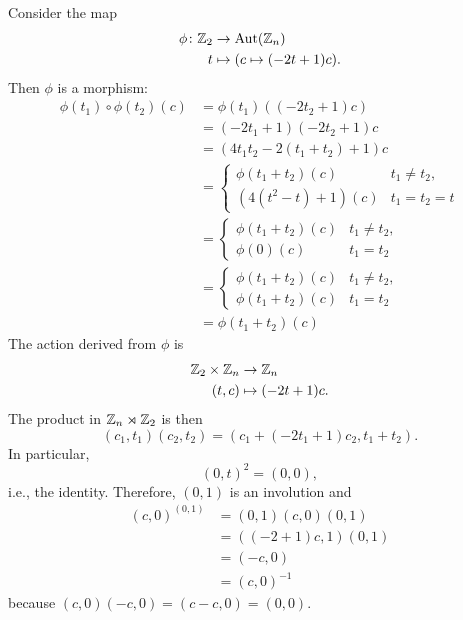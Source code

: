 \begin{xmpl}
\begin{enumerate}[a),font=\upshape]
        Consider the map
        \begin{align*}
            \phi\colon\mathbb{Z}_2&\to{\rm Aut}(\mathbb{Z}_n)\\
            t&\mapsto(c\mapsto(-2t+1)c).
        \end{align*}
        Then $\phi$ is a morphism:
        \begin{align*}
            \phi(t_1)\circ\phi(t_2)(c) &= \phi(t_1)((-2t_2+1)c)\\
                &= (-2t_1+1)(-2t_2+1)c\\
                &= (4t_1t_2-2(t_1+t_2)+1)c\\
                &=\begin{cases}
                    \phi(t_1+t_2)(c)    &t_1\ne t_2,\\
                    (4(t^2-t)+1)(c)   &t_1=t_2=t
                \end{cases}\\
                &= \begin{cases}
                    \phi(t_1+t_2)(c)    &t_1\ne t_2,\\
                    \phi(0)(c)   &t_1=t_2
                \end{cases}\\
                &= \begin{cases}
                    \phi(t_1+t_2)(c)    &t_1\ne t_2,\\
                    \phi(t_1+t_2)(c)    &t_1=t_2
                \end{cases}\\
                &=\phi(t_1+t_2)(c)
        \end{align*}
        The action derived from $\phi$ is
        \begin{align*}
            \mathbb{Z}_2\times\mathbb{Z}_n&\to\mathbb{Z}_n\\
            (t,c)&\mapsto (-2t+1)c.
        \end{align*}
        The product in $\mathbb{Z}_n\rtimes\mathbb{Z}_2$ is then
        $$
            (c_1,t_1)(c_2,t_2) = (c_1+(-2t_1+1)c_2, t_1+t_2).
        $$
        In particular,
        $$
            (0,t)^2 = (0,0),
        $$
        i.e., the identity. Therefore, $(0,1)$ is an involution and
        \begin{align*}
            (c,0)^{(0,1)} &= (0,1)(c,0)(0,1)\\
                &= ((-2+1)c,1)(0,1)\\
                &= (-c,0)\\
                &= (c,0)^{-1}
        \end{align*}
        because $(c,0)(-c,0)=(c-c,0)=(0,0)$.


\end{enumerate}
\end{xmpl}

